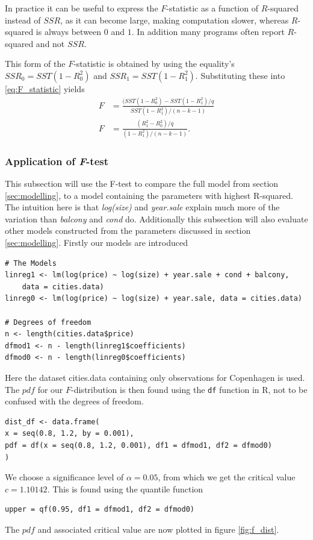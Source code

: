 In practice it can be useful to express the $F$-statistic as a function of $R$-squared instead of $SSR$, as it can become large, making computation slower, whereas $R$-squared is always between $0$ and $1$. In addition many programs often report $R$-squared and not $SSR$.

This form of the $F$-statistic is obtained by using the equality's $SSR_0 = SST(1 - R^2_0)$ and $SSR_1 = SST(1-R^2_1)$. Substituting these into \eqref{eq:F_statistic} yields
\begin{align}\label{eq:F_test_R}
    F &= \frac{(SST(1 - R^2_0) - SST(1-R^2_1)/q}{SST(1-R^2_1)/(n-k-1)} \nonumber \\
    F &= \frac{(R^2_1 - R^2_0)/q}{(1 - R^2_1)/(n-k-1)}.
\end{align}


\subsubsection{Application of \textit{F}-test}\label{sec:app_F_test}
This subsection will use the F-test to compare the full model from section \ref{sec:modelling}, to a model containing the parameters with highest R-squared. 
The intuition here is that \textit{log(size)} and \textit{year.sale} explain much more of the variation than \textit{balcony} and \textit{cond} do.
Additionally this subsection will also evaluate other models constructed from the parameters discussed in section \ref{sec:modelling}.
Firstly our models are introduced
\begin{lstlisting}
# The Models
linreg1 <- lm(log(price) ~ log(size) + year.sale + cond + balcony, 
    data = cities.data)
linreg0 <- lm(log(price) ~ log(size) + year.sale, data = cities.data)
    
# Degrees of freedom
n <- length(cities.data$price)
dfmod1 <- n - length(linreg1$coefficients)
dfmod0 <- n - length(linreg0$coefficients)
\end{lstlisting}
Here the dataset cities.data containing only observations for Copenhagen is used.
The $pdf$ for our $F$-distribution is then found using the \texttt{df} function in R, not to be confused with the degrees of freedom. 
\begin{lstlisting}
dist_df <- data.frame(
x = seq(0.8, 1.2, by = 0.001),
pdf = df(x = seq(0.8, 1.2, 0.001), df1 = dfmod1, df2 = dfmod0)
)
\end{lstlisting}
We choose a significance level of $\alpha = 0.05$, from which we get the critical value $c=1.10142$. 
This is found using the quantile function
\begin{lstlisting}
upper = qf(0.95, df1 = dfmod1, df2 = dfmod0)
\end{lstlisting}
The $pdf$ and associated critical value are now plotted in figure \ref{fig:f_dist}.
    
